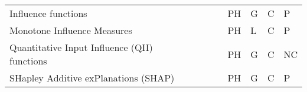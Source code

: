 \documentclass[final,1p,times]{elsarticle}
\begin{document}
\begin{table}[h!]
\begin{tabular}{m{4.2cm} m{2.5cm} m{0.5cm} m{0.5cm} m{0.5cm} m{0.6cm} m{0.8cm} m{0.6cm}}
    Influence functions & \citeauthor{koh2017understanding} & \cite{koh2017understanding} & \citeyear{koh2017understanding} & PH & G & C & P\\
    Monotone Influence Measures & \citeauthor{sliwinski2017characterization} & \cite{sliwinski2017characterization} &  \citeyear{sliwinski2017characterization} & PH & L & C & P\\
    Quantitative Input Influence (QII) functions &  \citeauthor{datta2016algorithmic} &  \cite{datta2016algorithmic} &  \citeyear{datta2016algorithmic} & PH & G & C & NC\\
    SHapley Additive exPlanations (SHAP) &  \citeauthor{lundberg2017unified} &  \cite{lundberg2017unified} &  \citeyear{lundberg2017unified} & PH & G & C & P\\
    \hline
\end{tabular}
\end{table}
\end{document}
